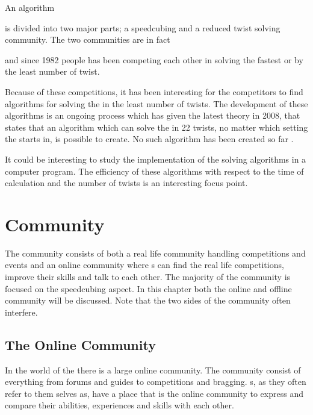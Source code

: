 An algorithm 



 
is divided into two major parts; a speedcubing and a reduced twist solving community. The two communities are in fact  


 and since 1982 people has been competing each other in solving the \rubik{} fastest or by the least number of twist. 


Because of these competitions, it has been interesting for the competitors to find algorithms for solving the \rubik{} in the least number of twists. The development of these algorithms is an ongoing process which has given the latest theory in 2008, that states that an algorithm which can solve the \rubik{} in 22 twists, no matter which setting the \rubik{} starts in, is possible to create. No such algorithm has been created so far \cite{rokicki09}.

It could be interesting to study the implementation of the solving algorithms in a computer program. The efficiency of these algorithms with respect to the time of calculation and the number of twists is an interesting focus point.


\chapter{Community}

The \rubik{} community consists of both a real life community handling competitions and events and an online community where \cuber{}s can find the real life competitions, improve their skills and talk to each other. The majority of the community is focused on the speedcubing aspect. In this chapter both the online and offline community will be discussed. Note that the two sides of the community often interfere.

\section{The Online Community}
In the world of the \rubik{} there is a large online community. The community consist of everything from forums and guides to competitions and bragging. s, as they often refer to them selves as, have a place that is the online community to express and compare their abilities, experiences and skills with each other. 
